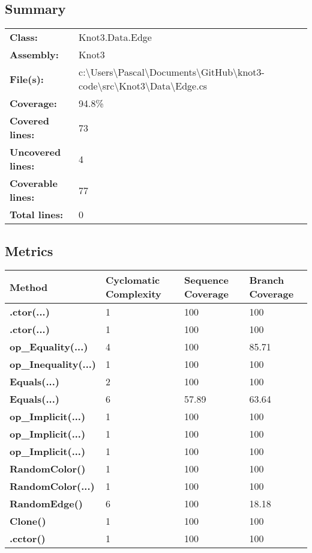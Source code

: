 \documentclass[a4paper,10pt]{article}
\begin{document}
\subsection{Summary}
\begin{longtable}[l]{ll}
\textbf{Class:} & Knot3.Data.Edge\\
\textbf{Assembly:} & Knot3\\
\textbf{File(s):} & \begin{minipage}[t]{12cm}{c:\textbackslash Users\textbackslash Pascal\textbackslash Documents\textbackslash GitHub\textbackslash knot3-code\textbackslash src\textbackslash Knot3\textbackslash Data\textbackslash Edge.cs}\end{minipage} \\
\textbf{Coverage:} & 94.8\%\\
\textbf{Covered lines:} & 73\\
\textbf{Uncovered lines:} & 4\\
\textbf{Coverable lines:} & 77\\
\textbf{Total lines:} & 0\\
\end{longtable}
\subsection{Metrics}
\begin{longtable}[l]{|l|l|l|l|}
\hline
\textbf{Method} & \textbf{Cyclomatic Complexity} & \textbf{Sequence Coverage} & \textbf{Branch Coverage}\\
\hline
\textbf{.ctor(...)} & 1 & 100 & 100\\
\hline
\textbf{.ctor(...)} & 1 & 100 & 100\\
\hline
\textbf{op\_Equality(...)} & 4 & 100 & 85.71\\
\hline
\textbf{op\_Inequality(...)} & 1 & 100 & 100\\
\hline
\textbf{Equals(...)} & 2 & 100 & 100\\
\hline
\textbf{Equals(...)} & 6 & 57.89 & 63.64\\
\hline
\textbf{op\_Implicit(...)} & 1 & 100 & 100\\
\hline
\textbf{op\_Implicit(...)} & 1 & 100 & 100\\
\hline
\textbf{op\_Implicit(...)} & 1 & 100 & 100\\
\hline
\textbf{RandomColor()} & 1 & 100 & 100\\
\hline
\textbf{RandomColor(...)} & 1 & 100 & 100\\
\hline
\textbf{RandomEdge()} & 6 & 100 & 18.18\\
\hline
\textbf{Clone()} & 1 & 100 & 100\\
\hline
\textbf{.cctor()} & 1 & 100 & 100\\
\hline
\end{longtable}
\end{document}
